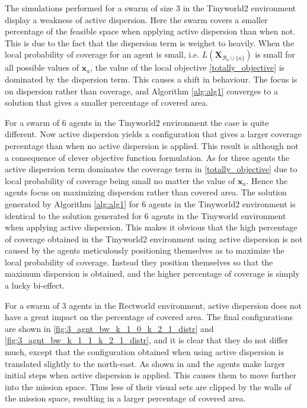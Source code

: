 The simulations performed for a swarm of size 3 in the Tinyworld2 environment display a weakness of active dispersion. Here the swarm covers a smaller percentage of the 
feasible space when applying active dispersion than when not. This is due to the fact that the dispersion term is weighet to heavily. When the local probability of coverage for an agent is small, i.e. $L(\mathbf{X}_{\mathcal{B}_{a}\cup\{a\}})$ is small 
for all possible values of $\mathbf{x}_{a}$, the value of 
the local objective \eqref{totally_objective} is dominated by the dispersion term. This causes a shift in behaviour. The focus is on dispersion rather than coverage, and Algorithm \ref{alg:alg1} converges
to a solution that gives a smaller percentage of covered area.

For a swarm of 6 agents in the Tinyworld2 environment the case is quite different. Now active dispersion yields a configuration that gives a larger coverage percentage than when no active
dispersion is applied. This result is although not a consequence of clever objective function formulation. As for three agents the active dispersion term dominates the coverage term
in \eqref{totally_objective} due to local probability of coverage being small no matter the value of $\mathbf{x}_{a}$. Hence the agents focus on maximizing dispersion rather than covered area. The 
solution generated by Algorithm \ref{alg:alg1} for 6 agents in the Tinyworld2 environment is identical to the solution generated for 6 agents in the Tinyworld environment when applying active dispersion. 
This makes it obvious that the high percentage of coverage obtained in the Tinyworld2 environment using active dispersion is not caused by the agents meticulously positioning themselves as to maximize the local
probability of coverage. Instead they position themselves so that the maximum dispersion is obtained, and the higher percentage of coverage is simply a lucky bi-effect.

For a swarm of 3 agents in the Rectworld environment, active dispersion does not have a great impact on the percentage of covered area. The final configurations are shown in 
\ref{fig:3_agnt_bw_k_1_0_k_2_1_distr} and \ref{fig:3_agnt_bw_k_1_1_k_2_1_distr}, and it is clear that they do not differ much, except that the configuration obtained when using active dispersion
is translated slightly to the north-east. As shown in  and  the agents make larger initial steps when active dispersion is applied. This
causes them to move further into the mission space. Thus less of their visual sets are clipped by the walls of the mission space, resulting in a larger percentage of covered area.

